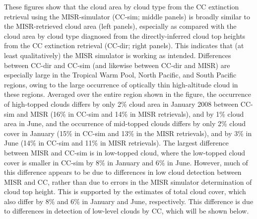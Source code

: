 These figures show that the cloud area by cloud type from the CC extinction retrieval using the MISR-simulator (CC-sim; middle panels) is broadly similar to the MISR-retrieved cloud area (left panels), especially as compared with the cloud area by cloud type diagnosed from the directly-inferred cloud top heights from the CC extinction retrieval (CC-dir; right panels). This indicates that (at least qualitatively) the MISR simulator is working as intended. Differences between CC-dir and CC-sim (and likewise between CC-dir and MISR) are especially large in the Tropical Warm Pool, North Pacific, and South Pacific regions, owing to the large occurrence of optically thin high-altitude cloud in these regions. Averaged over the entire region shown in the figure, the occurrence of high-topped clouds differs by only 2\% cloud area in January 2008 between CC-sim and MISR (16\% in CC-sim and 14\% in MISR retrievals), and by 1\% cloud area in June, and the occurrence of mid-topped clouds differs by only 2\% cloud cover in January (15\% in CC-sim and 13\% in the MISR retrievals), and by 3\% in June (14\% in CC-sim and 11\% in MISR retrievals). The largest difference between MISR and CC-sim is in low-topped cloud, where the low-topped cloud cover is smaller in CC-sim by 8\% in January and 6\% in June. However, much of this difference appears to be due to differences in low cloud detection between MISR and CC, rather than due to errors in the MISR simulator determination of cloud top height. This is supported by the estimates of total cloud cover, which also differ by 8\% and 6\% in January and June, respectively. This difference is due to differences in detection of low-level clouds by CC, which will be shown below.

